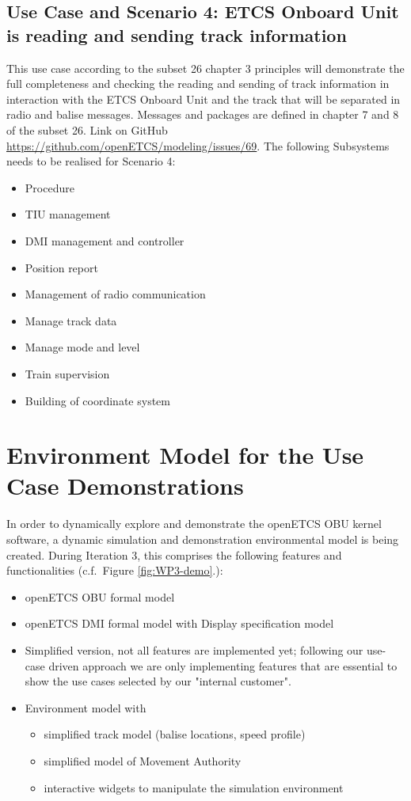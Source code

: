 \subsection{Use Case and Scenario 4: ETCS Onboard Unit is reading and sending track information}
This use case according to the subset 26 chapter 3 principles will demonstrate the full completeness and checking the reading and sending of track information in interaction with the ETCS Onboard Unit and the track that will be separated in radio and balise messages. Messages and packages are defined in chapter 7 and 8 of the subset 26. Link on GitHub \url{https://github.com/openETCS/modeling/issues/69}. The following Subsystems needs to be realised for Scenario 4:
\begin{itemize}
\item Procedure
\item TIU management
\item DMI management and controller
\item Position report
\item Management of radio communication
\item Manage track data
\item Manage mode and level
\item Train supervision
\item Building of coordinate system
\end{itemize}

\section{Environment Model for the Use Case Demonstrations}

In order to dynamically explore and demonstrate the openETCS OBU kernel software, a dynamic simulation and demonstration environmental model is being created. During Iteration 3, this comprises the following features and functionalities (c.f.~Figure \ref{fig:WP3-demo}.):
\begin{itemize}
\item openETCS OBU formal model
\item openETCS DMI formal model with Display specification model
\item Simplified version, not all features are implemented yet; following our use- case driven approach we are only implementing features that are essential to show the use cases selected by our "internal customer".
\item Environment model with
	\begin{itemize}
	\item simplified track model (balise locations, speed profile)
	\item simplified model of Movement Authority
	\item interactive widgets to manipulate the simulation environment
	\end{itemize}
\end{itemize}

